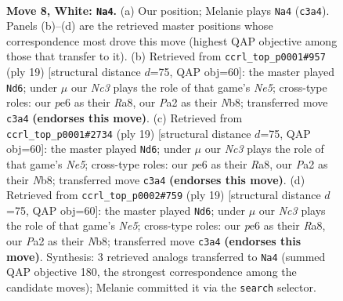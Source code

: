 \documentclass[11pt]{article}
\begin{document}
\begin{figure}[p]\centering
\begin{subfigure}{0.46\textwidth}\centering
\resizebox{\linewidth}{!}{%
\newchessgame
\chessboard[
  setfen={rnb1k2r/pppnqpp1/4p3/3pP2p/3P1P2/2N5/PPP3PP/R2QKBNR w KQkq - 0 8},
  showmover=false,
  pgfstyle=straightmove, color=movearrow, markmove={c3-a4}
]}
\caption{}
\end{subfigure}\hfill
\begin{subfigure}{0.46\textwidth}\centering
\resizebox{\linewidth}{!}{%
\newchessgame
\chessboard[
  setfen={rnbqk2r/1p3ppp/2p1p3/p7/P1pPn3/5NP1/1P2PPBP/RNQ1K2R b KQkq - 2 10},
  showmover=false,
  pgfstyle=straightmove, color=movearrow, markmove={e4-d6}
]}
\caption{}
\end{subfigure}
\\[4pt]
\begin{subfigure}{0.46\textwidth}\centering
\resizebox{\linewidth}{!}{%
\newchessgame
\chessboard[
  setfen={rnbqk2r/1p3ppp/2p1p3/p7/P1pPn3/5NP1/1P2PPBP/RNQ1K2R b KQkq - 2 10},
  showmover=false,
  pgfstyle=straightmove, color=movearrow, markmove={e4-d6}
]}
\caption{}
\end{subfigure}\hfill
\begin{subfigure}{0.46\textwidth}\centering
\resizebox{\linewidth}{!}{%
\newchessgame
\chessboard[
  setfen={rnbqk2r/1p3ppp/2p1p3/p7/P1pPn3/5NP1/1P2PPBP/RNQ1K2R b KQkq - 2 10},
  showmover=false,
  pgfstyle=straightmove, color=movearrow, markmove={e4-d6}
]}
\caption{}
\end{subfigure}
\caption{\textbf{Move 8, White: \texttt{Na4}.} (a) Our position; Melanie plays \texttt{Na4} (\texttt{c3a4}). Panels (b)--(d) are the retrieved master positions whose correspondence most drove this move (highest QAP objective among those that transfer to it). (b) Retrieved from \texttt{ccrl\_top\_p0001\#957} (ply 19) [structural distance $d$=75, QAP obj=60]: the master played \texttt{Nd6}; under $\mu$ our \emph{Nc3} plays the role of that game's \emph{Ne5}; cross-type roles: our \emph{p}e6 as their \emph{R}a8, our \emph{P}a2 as their \emph{N}b8; transferred move \texttt{c3a4} \textbf{(endorses this move)}. (c) Retrieved from \texttt{ccrl\_top\_p0001\#2734} (ply 19) [structural distance $d$=75, QAP obj=60]: the master played \texttt{Nd6}; under $\mu$ our \emph{Nc3} plays the role of that game's \emph{Ne5}; cross-type roles: our \emph{p}e6 as their \emph{R}a8, our \emph{P}a2 as their \emph{N}b8; transferred move \texttt{c3a4} \textbf{(endorses this move)}. (d) Retrieved from \texttt{ccrl\_top\_p0002\#759} (ply 19) [structural distance $d$=75, QAP obj=60]: the master played \texttt{Nd6}; under $\mu$ our \emph{Nc3} plays the role of that game's \emph{Ne5}; cross-type roles: our \emph{p}e6 as their \emph{R}a8, our \emph{P}a2 as their \emph{N}b8; transferred move \texttt{c3a4} \textbf{(endorses this move)}. Synthesis: 3 retrieved analogs transferred to \texttt{Na4} (summed QAP objective 180, the strongest correspondence among the candidate moves); Melanie committed it via the \texttt{search} selector.}
\label{fig:thought-m14}
\end{figure}
\end{document}
